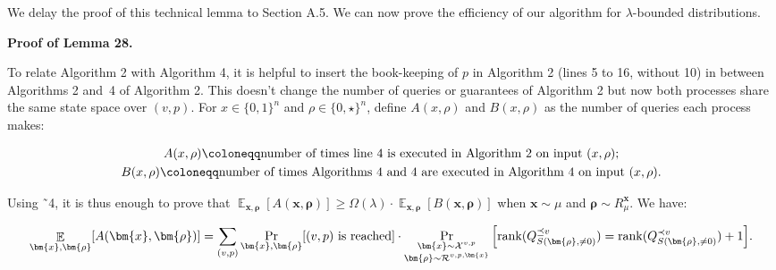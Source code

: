 


We delay the proof of this technical lemma to Section A.5. We can now prove the efficiency of our algorithm for $\lambda$-bounded distributions.\par




\par\medskip\noindent\textbf{Proof of Lemma 28.}\par




To relate Algorithm 2 with Algorithm 4, it is helpful to insert the book-keeping of $p$ in Algorithm 2 (lines 5 to 16, without 10) in between Algorithms 2 and 4 of Algorithm 2. This doesn’t change the number of queries or guarantees of Algorithm 2 but now both processes share the same state space over $(v,p)$. For $x\in\{0,1\}^{n}$ and $\rho\in\{0,\star\}^{n}$, define $A(x,\rho)$ and $B(x,\rho)$ as the number of queries each process makes:\par




\[\begin{gathered}
\displaystyle A(x,\rho) \displaystyle\coloneqq\text{number of times line\nobreak\ 4 is executed in Algorithm 2 on input $(x,\rho)$}; \\
\displaystyle B(x,\rho) \displaystyle\coloneqq\text{number of times Algorithms 4 and\nobreakspace4 are executed in Algorithm 4 on input $(x,\rho)$}.
\end{gathered}\]


Using ˜4, it is thus enough to prove that $\mathop{\mathbb{E}}_{\bm{x},\bm{\rho}}\left[A(\bm{x},\bm{\rho})\right]\geq\Omega(\lambda)\cdot\mathop{\mathbb{E}}_{\bm{x},\bm{\rho}}\left[B(\bm{x},\bm{\rho})\right]$ when $\bm{x}\sim\mu$ and $\bm{\rho}\sim R_{\mu}^{\bm{x}}$. We have:\par


\[\begin{gathered}
\mathop{\mathbb{E}}_{\bm{x},\bm{\rho}}[A(\bm{x},\bm{\rho})]=\sum_{(v,p)}\Pr_{\bm{x},\bm{\rho}}[\text{$(v,p)$ is reached}]\cdot\Pr_{\begin{subarray}{c}\bm{x}\sim\mathcal{X}^{v,p}\\
\bm{\rho}\sim\mathcal{R}^{v,p,\bm{x}}\end{subarray}}\Big{[}\mathrm{rank}(Q^{\preceq v}_{S(\bm{\rho},\neq 0)})=\mathrm{rank}(Q^{\prec v}_{S(\bm{\rho},\neq 0)})+1\Big{]}.
\end{gathered}\]


